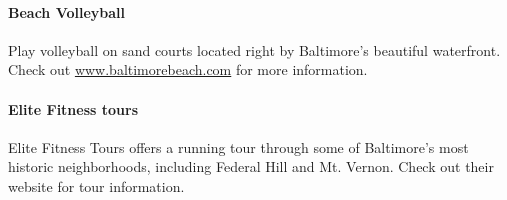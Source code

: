 \paragraph*{Beach Volleyball}
Play volleyball on sand courts located right by Baltimore's beautiful waterfront. Check out \url{www.baltimorebeach.com} for more information.

\paragraph*{Elite Fitness tours}
Elite Fitness Tours offers a running tour through some of Baltimore's most historic neighborhoods, including Federal Hill and Mt. Vernon. Check out their website for tour information. 
